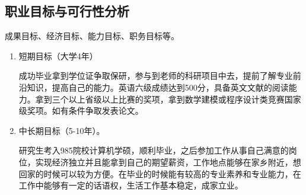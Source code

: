 \documentclass{article}
\begin{document}
\subsection{职业目标与可行性分析}
\par
成果目标、经济目标、能力目标、职务目标等。\par 
\begin{enumerate}[(1)]
	\item 短期目标（大学4年）
	
成功毕业拿到学位证争取保研，参与到老师的科研项目中去，提前了解专业前沿知识，提高自己的能力。英语六级成绩达到500分，具备英文文献的阅读能力。拿到三个以上省级以上比赛的奖项，拿到数学建模或程序设计类竞赛国家级奖项。如有条件争取发表论文。
	\item 中长期目标（5-10年）。
	
研究生考入985院校计算机学硕，顺利毕业，之后参加工作从事自己满意的岗位，实现经济独立并且能拿到自己的期望薪资，工作地点能够在家乡附近，想回家的时候可以较为方便。在毕业的时候能有较高的专业素养和专业能力，在工作中能够有一定的话语权，生活工作基本稳定，成家立业。
\end{enumerate}
\iffalse
这里是简单列表的样例：（如果需要标号自定义或者自动标记数字序号，请自行搜索语法）

\begin{itemize}
    \item 简单的列表结构 
    \item 如这里所示
    \item 此处仅为样例
    \item 按需修改和使用
\end{itemize}
\fi
\end{document}
